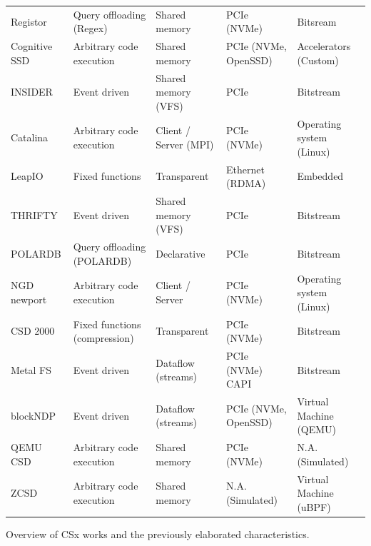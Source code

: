 \begin{table}
\begin{adjustbox}{width=1\textwidth}
\begin{threeparttable}[]
\begin{tabular}{lllll}
                Registor \cite{10.1145/3310149} & Query offloading (Regex) & Shared memory & PCIe (NVMe) & Bitsream \\
                Cognitive SSD \cite{8839401} & Arbitrary code execution & Shared memory & PCIe (NVMe, OpenSSD) & Accelerators (Custom) \\
                INSIDER \cite{234968} & Event driven & Shared memory (VFS) & PCIe & Bitstream \\
                Catalina \cite{8855540} & Arbitrary code execution & Client / Server (MPI) & PCIe (NVMe) & Operating system (Linux) \\
                LeapIO \cite{10.1145/3373376.3378531} & Fixed functions & Transparent & Ethernet (RDMA) & Embedded \\
                THRIFTY \cite{10.1145/3400302.3415723} & Event driven\footnotemark[7] & Shared memory (VFS)\footnotemark[7] & PCIe\footnotemark[7] & Bitstream\footnotemark[7] \\
                POLARDB \cite{246154} & Query offloading (POLARDB) & Declarative & PCIe & Bitstream \\
                NGD newport \cite{10.1145/3415580} & Arbitrary code execution & Client / Server & PCIe (NVMe) & Operating system (Linux) \\
                CSD 2000 \cite{10.1145/3399666.3399934} & Fixed functions (compression) & Transparent & PCIe (NVMe) & Bitstream \\
                Metal FS \cite{10.1145/3342195.3387557} & Event driven & Dataflow (streams) & PCIe (NVMe) \/ CAPI & Bitstream \\
                blockNDP \cite{10.1145/3429357.3430519} & Event driven & Dataflow (streams) & PCIe (NVMe, OpenSSD) & Virtual Machine (QEMU) \\
                QEMU CSD \cite{10.1145/3439839.3459085} & Arbitrary code execution & Shared memory & PCIe (NVMe) & N.A. (Simulated) \\
                ZCSD \cite{lukken2021zcsd} & Arbitrary code execution & Shared memory & N.A. (Simulated) & Virtual Machine (uBPF) \\
                \bottomrule
            \end{tabular}
            \begin{tablenotes}
                \centering Overview of CSx works and the previously elaborated
                characteristics.
            \end{tablenotes}
        \end{threeparttable}
        \label{table:csxoverview}
    \end{adjustbox}
\end{table}

